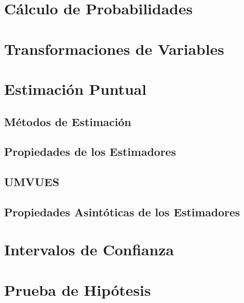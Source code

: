 \documentclass{article}
\begin{document}
\tableofcontents

\section{Cálculo de Probabilidades}
\section{Transformaciones de Variables}
\section{Estimación Puntual}
\subsection{Métodos de Estimación}
\subsection{Propiedades de los Estimadores}
\subsection{UMVUES}
\subsection{Propiedades Asintóticas de los Estimadores}
\section{Intervalos de Confianza}
\section{Prueba de Hipótesis}
\end{document}
